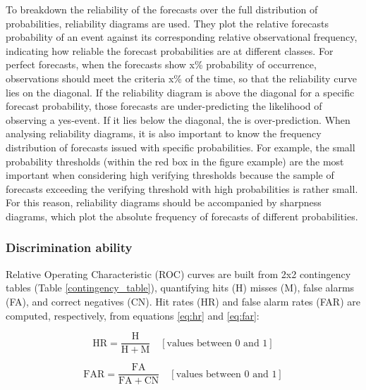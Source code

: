 To breakdown the reliability of the forecasts over the full distribution of probabilities, reliability diagrams are used. They plot the relative forecasts probability of an event against its corresponding relative observational frequency, indicating how reliable the forecast probabilities are at different classes. For perfect forecasts, when the forecasts show x\% probability of occurrence, observations should meet the criteria x\% of the time, so that the reliability curve lies on the diagonal. If the reliability diagram is above the diagonal for a specific forecast probability, those forecasts are under-predicting the likelihood of observing a yes-event. If it lies below the diagonal, the is over-prediction. When analysing reliability diagrams, it is also important to know the frequency distribution of forecasts issued with specific probabilities. For example, the small probability thresholds (within the red box in the figure example) are the most important when considering high verifying thresholds because the sample of forecasts exceeding the verifying threshold with high probabilities is rather small. For this reason, reliability diagrams should be accompanied by sharpness diagrams, which plot the absolute frequency of forecasts of different probabilities. 


\subsubsection{Discrimination ability}



Relative Operating Characteristic (ROC) curves are built from 2x2 contingency tables (Table \ref{contingency_table}), quantifying hits (H) misses (M), false alarms (FA), and correct negatives (CN). Hit rates (HR) and false alarm rates (FAR) are computed, respectively, from equations \ref{eq:hr} and \ref{eq:far}:

\begin{equation}
\mathrm{HR} = \frac{\mathrm{H}}{\mathrm{H} + \mathrm{M}}\quad[\text{values between }0\text{ and }1]
\label{eq:hr}
\end{equation}

\begin{equation}
\mathrm{FAR} = \frac{\mathrm{FA}}{\mathrm{FA} + \mathrm{CN}}\quad[\text{values between }0\text{ and }1]
\label{eq:far}
\end{equation}

